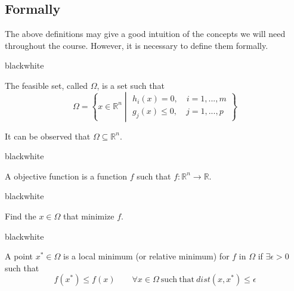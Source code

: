 \subsection{Formally}
\label{sec:introduction.modeling.formally}

The above definitions may give a good intuition of the concepts we will need throughout the course. However, it is necessary to define them formally.

\begin{remark}{black}{white}
    \begin{definition}
        The feasible set, called \( \Omega \), is a set such that
        \[ 
            \Omega = \left\{ 
                x \in \mathbb{R}^n   
                \middle\vert
                \begin{array}{l}
                    h_i(x) = 0, \quad i = 1, ..., m \\
                    g_j(x) \leq 0, \quad j = 1, ..., p
                \end{array}
            \right\}
        \]
    \end{definition}
\end{remark}

It can be observed that \( \Omega \subseteq \mathbb{R}^n \).

\begin{remark}{black}{white}
    \begin{definition}
        A objective function is a function \( f \) such that \( f : \mathbb{R}^n \rightarrow \mathbb{R} \).
    \end{definition}
\end{remark}

\begin{remark}{black}{white}
    \begin{definition}
        Find the \( x \in \Omega \) that minimize \( f \).
    \end{definition}
\end{remark}

\begin{remark}{black}{white}
    \begin{definition}
        A point \( x^* \in \Omega \) is a local minimum (or relative minimum) for \( f \) in \( \Omega \) if \( \exists \epsilon > 0 \) such that
        \[
            f(x^*) \leq f(x) \qquad \forall x \in \Omega \mathrm{~such~that~} \mathit{dist}(x, x^*) \leq \epsilon
        \]
    \end{definition}
\end{remark}

